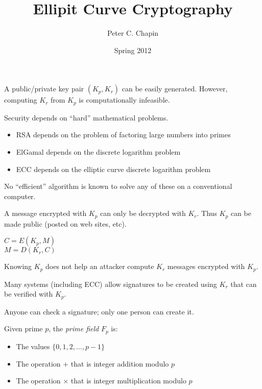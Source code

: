 \documentclass[landscape]{slides}
\begin{document}
\title{Ellipit Curve Cryptography}
\author{Peter C. Chapin}
\date{Spring 2012}
\maketitle



A public/private key pair $(K_p, K_r)$ can be easily generated. However, computing $K_r$ from
$K_p$ is computationally infeasible.

Security depends on ``hard'' mathematical problems.
\begin{itemize}
\item RSA depends on the problem of factoring large numbers into primes
\item ElGamal depends on the discrete logarithm problem
\item ECC depends on the elliptic curve discrete logarithm problem
\end{itemize}

No ``efficient'' algorithm is known to solve any of these on a conventional
computer.

\stopslide



A message encrypted with $K_p$ can only be decrypted with $K_r$. Thus $K_p$ can be made public
(posted on web sites, etc).

$C = E(K_p, M)$ \\
$M = D(K_r, C)$

Knowing $K_p$ does not help an attacker compute $K_r$ messages encrypted with $K_p$.

Many systems (including ECC) allow signatures to be created using $K_r$ that can be verified
with $K_p$.

Anyone can check a signature; only one person can create it.

\stopslide



Given prime $p$, the \textit{prime field} $F_p$ is:
\begin{itemize}
\item The values $\{ 0, 1, 2, \ldots, p - 1 \}$
\item The operation $+$ that is integer addition modulo $p$
\item The operation $\times$ that is integer multiplication modulo $p$
\end{itemize}
\end{document}
